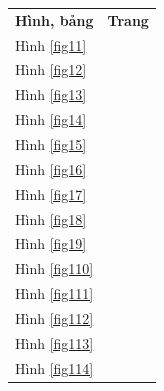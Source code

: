 \documentclass[12pt,a4paper]{report}
\numberwithin{equation}{section}
\theoremstyle{definition} %
\begin{document}
\begin{longtable}{l   l }
	\textbf{Hình, bảng}  & \textbf{Trang}       \\
Hình \ref{fig11} & \pageref{fig11} \\
Hình \ref{fig12} & \pageref{fig12} \\
Hình \ref{fig13} & \pageref{fig13} \\
Hình \ref{fig14} & \pageref{fig14} \\
Hình \ref{fig15} & \pageref{fig15} \\
Hình \ref{fig16} & \pageref{fig16} \\
Hình \ref{fig17} & \pageref{fig17} \\
Hình \ref{fig18} & \pageref{fig18} \\
Hình \ref{fig19} & \pageref{fig19} \\
Hình \ref{fig110} & \pageref{fig110} \\
Hình \ref{fig111} & \pageref{fig111} \\
Hình \ref{fig112} & \pageref{fig112} \\
Hình \ref{fig113} & \pageref{fig113} \\
Hình \ref{fig114} & \pageref{fig114} \\

\end{longtable}
\end{document}
